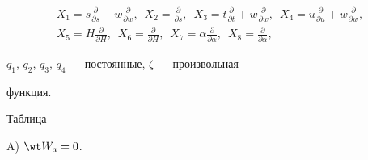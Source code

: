 \begin{gather*} 


X_1=s\frac{\partial}{\partial s}-w\frac{\partial}{\partial w},\ \; 


X_2=\frac{\partial}{\partial s},\ \; 


X_3=t\frac{\partial}{\partial t}+w\frac{\partial}{\partial w},\ \; 


X_4=u\frac{\partial}{\partial u}+w\frac{\partial}{\partial w}, \\ 


% 


X_5=H\frac{\partial}{\partial H},\ \; 


X_6=\frac{\partial}{\partial H},\ \; 


X_7=\alpha\frac{\partial}{\partial\alpha},\ \; 


X_8=\frac{\partial}{\partial\alpha}, 


\end{gather*} 


$q_1$, $q_2$, $q_3$, $q_4$ --- постоянные, $\zeta$ --- произвольная 


функция. 


\medskip





{\hfill Таблица}


\smallskip





A) $\wt W_a=0$.


\smallskip





